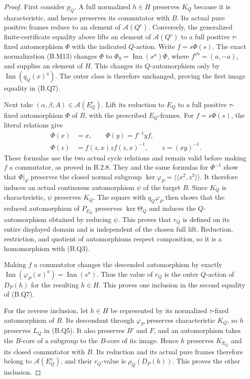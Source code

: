 \begin{proof}
First consider $p_Q$.  A full normalized $h\in H$ preserves
$K_Q$ because it is characteristic, and hence preserves its
commutator with $B$.  Its actual pure positive frames reduce
to an element of $\mathcal A(Q^{\mathrm c})$.  Conversely,
the generalized finite-certificate equality above lifts an
element of $\mathcal A(Q^{\mathrm c})$ to a full positive
$\tau$-fixed automorphism $\Phi$ with the indicated $Q$-action.
Write $f=s\Phi(s)$.  The exact normalization (B.M13) changes
$\Phi$ to $\Phi_0=\operatorname{Inn}(x^a)\Phi$, where
$f^{\mathrm{ab}}=(a,-a)$, and supplies an element of $H$.
This changes its $Q$-automorphism only by
$\operatorname{Inn}(q_Q(x)^a)$.  The outer class is therefore
unchanged, proving the first image equality in (B.Q7).

Next take $(\alpha,\beta,A)\in\mathcal A(E_Q^{\mathrm c})$.
Lift its reduction to $E_Q$ to a full positive $\tau$-fixed
automorphism $\Phi$ of $B$, with the prescribed $E_Q$-frames.
For $f=s\Phi(s)$, the literal relations give
\[
\begin{aligned}
 \Phi(x)&=x,\qquad \Phi(y)=f^{-1}yf,\\
 \Phi(z)&=f(z,x)z f(z,x)^{-1},\qquad z=(xy)^{-1}.
\end{aligned}                                                   \tag{B.Q10}
\]
These formulas use the two actual cycle relations and remain
valid before making $f$ a commutator, as proved in B.2.8.
They and the same formulas for $\Phi^{-1}$ show that $\Phi|_F$
preserves the closed normal subgroup
$\ker\varphi_P=\langle\!\langle x^2,z^3\rangle\!\rangle$.
It therefore induces an actual continuous automorphism
$\psi$ of the target $B$.  Since $K_Q$ is characteristic,
$\psi$ preserves $K_Q$.  The square with $q_Q\varphi_P$
then shows that the reduced automorphism of $P_{E_Q}$
preserves $\ker\Theta_Q$ and induces the $Q$-automorphism
obtained by reducing $\psi$.  This proves that $r_Q$ is
defined on its entire displayed domain and is independent
of the chosen full lift.  Reduction, restriction, and
quotient of automorphisms respect composition, so it is a
homomorphism with (B.Q3).

Making $f$ a commutator changes the descended automorphism
by exactly $\operatorname{Inn}(\varphi_P(x)^a)
=\operatorname{Inn}(s^a)$.  Thus the value of $r_Q$ is the
outer $Q$-action of $D_P(h)$ for the resulting $h\in H$.
This proves one inclusion in the second equality of (B.Q7).

For the reverse inclusion, let $h\in H$ be represented by
its normalized $\tau$-fixed automorphism of $B$.  Its
descendant through $\varphi_P$ preserves characteristic
$K_Q$, so $h$ preserves $L_Q$ in (B.Q5).  It also preserves
$B'$ and $F$, and an automorphism takes the $B$-core of a
subgroup to the $B$-core of its image.  Hence $h$ preserves
$K_{E_Q}$ and its closed commutator with $B$.  Its reduction
and its actual pure frames therefore belong to
$\mathcal A(E_Q^{\mathrm c})$, and their $r_Q$-value is
$\rho_Q(D_P(h))$.  This proves the other inclusion.


\end{proof}
